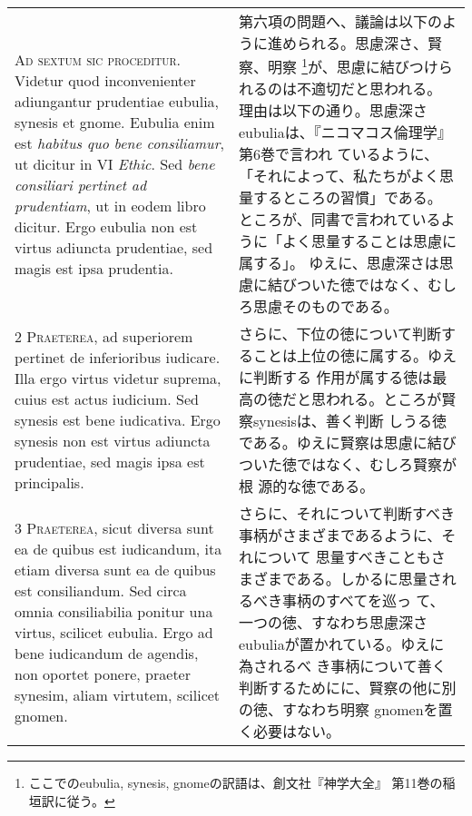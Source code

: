 \documentclass[10pt]{jsarticle}
\begin{document}
\begin{longtable}{p{21em}p{21em}}

{\huge A}{\scshape d sextum sic proceditur}. Videtur quod
inconvenienter adiungantur prudentiae eubulia, synesis et
gnome. Eubulia enim est {\itshape habitus quo bene consiliamur}, ut
dicitur in VI {\itshape Ethic}. Sed {\itshape bene consiliari pertinet
ad prudentiam}, ut in eodem libro dicitur. Ergo eubulia non est virtus
adiuncta prudentiae, sed magis est ipsa prudentia.

&

第六項の問題へ、議論は以下のように進められる。思慮深さ、賢察、明察
\footnote{ここでのeubulia, synesis, gnomeの訳語は、創文社『神学大全』
第11巻の稲垣訳に従う。}が、思慮に結びつけられるのは不適切だと思われる。
理由は以下の通り。思慮深さeubuliaは、『ニコマコス倫理学』第6巻で言われ
ているように、「それによって、私たちがよく思量するところの習慣」である。
ところが、同書で言われているように「よく思量することは思慮に属する」。
ゆえに、思慮深さは思慮に結びついた徳ではなく、むしろ思慮そのものである。

\\

{\scshape 2 Praeterea}, ad superiorem pertinet de inferioribus
iudicare. Illa ergo virtus videtur suprema, cuius est actus
iudicium. Sed synesis est bene iudicativa. Ergo synesis non est virtus
adiuncta prudentiae, sed magis ipsa est principalis.

&

さらに、下位の徳について判断することは上位の徳に属する。ゆえに判断する
作用が属する徳は最高の徳だと思われる。ところが賢察synesisは、善く判断
しうる徳である。ゆえに賢察は思慮に結びついた徳ではなく、むしろ賢察が根
源的な徳である。

\\

{\scshape 3 Praeterea}, sicut diversa sunt ea de quibus est
iudicandum, ita etiam diversa sunt ea de quibus est consiliandum. Sed
circa omnia consiliabilia ponitur una virtus, scilicet eubulia. Ergo
ad bene iudicandum de agendis, non oportet ponere, praeter synesim,
aliam virtutem, scilicet gnomen.

&

さらに、それについて判断すべき事柄がさまざまであるように、それについて
思量すべきこともさまざまである。しかるに思量されるべき事柄のすべてを巡っ
て、一つの徳、すなわち思慮深さeubuliaが置かれている。ゆえに為されるべ
き事柄について善く判断するためにに、賢察の他に別の徳、すなわち明察
gnomenを置く必要はない。


\end{longtable}
\end{document}
